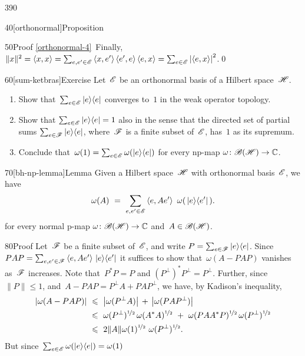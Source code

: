 \begin{parsec}{390}
\begin{point}{40}[orthonormal]{Proposition}
\begin{point}{50}{Proof}
\ref{orthonormal-4}\ 
Finally,
$\|x\|^2=\left<x,x\right>
= \sum_{e,e'\in\mathscr{E}}
\left<x,e'\right>\left<e',e\right>\left<e,x\right>
= \sum_{e\in \mathscr{E}} \left|\left<e,x\right>\right|^2$.\qed
\end{point}
\end{point}
\begin{point}{60}[sum-ketbras]{Exercise}%
Let~$\mathscr{E}$ be an orthonormal basis of a Hilbert space~$\mathscr{H}$.
\begin{enumerate}
\item
Show that~$\sum_{e\in\mathscr{E}} \left|e\right>\!\left<e\right|$
converges to~$1$
in the weak operator topology.
\item
Show that $\sum_{e\in\mathscr{E}}\left|e\right>\!\left<e\right|=1$
also in the sense
that the directed
set of partial sums
$\sum_{e\in \mathscr{F}} \left|e\right>\!\left<e\right|$,
where~$\mathscr{F}$ is a finite subset of~$\mathscr{E}$,
has~$1$ as its supremum.
\item
Conclude that~$\omega(1)=\sum_{e\in\mathscr{E}} \omega(\left|e\right>\!\left<e\right|)$
for every np-map $\omega\colon \mathscr{B}(\mathscr{H})\to\mathbb{C}$.
\end{enumerate}
\end{point}
\begin{point}{70}[bh-np-lemma]{Lemma}%
Given a Hilbert space~$\mathscr{H}$
with orthonormal basis~$\mathscr{E}$,
we have
\begin{equation*}
	\omega(A)\ = \ 
	\sum_{e,e'\in\scrE} \left<e,Ae'\right>\ \omega(\,\ketbra{e}{e'}\,).
\end{equation*}
for every normal p-map $\omega\colon \mathscr{B}(\mathscr{H})\to\mathbb{C}$
and~$A\in\mathscr{B}(\mathscr{H})$.
\begin{point}{80}{Proof}%
Let~$\mathscr{F}$ be a finite subset of~$\mathscr{E}$,
and write $P=\sum_{e\in \mathscr{F}} \left|e\right>\!\left<e\right|$.
Since $PAP
= \sum_{e,e'\in\mathscr{F}}\left<e,Ae'\right>\,\left|e\right>\!\left<e'\right|$
it suffices
to show that~$\omega(A-PAP)$
vanishes as~$\mathscr{F}$ increases.
Note that~$P^*P=P$ and
$(P^\perp)^*P^\perp=P^\perp$.
Further,
since
$\|P\|\leq 1$,
and~$A-PAP=P^\perp A + PAP^\perp$,
we have,
by Kadison's inequality,
\begin{alignat*}{3}
\left|\omega(A-PAP)\right|
\ &\leq\  \left|\omega(P^\perp A)\right| \,+\,\left|\omega(PAP^\perp)\right| \\
\ &\leq\  
\omega(P^\perp)^{\nicefrac{1}{2}}\,
\omega(A^*A)^{\nicefrac{1}{2}}
\ +\ 
\omega(PAA^*P)^{\nicefrac{1}{2}}\,
\omega(P^\perp)^{\nicefrac{1}{2}}\\
\ &\leq\  
2\|A\| 
\omega(1)^{\nicefrac{1}{2}}\ 
\omega(P^\perp)^{\nicefrac{1}{2}}.
\end{alignat*}
But since~$\sum_{e\in\mathscr{E}} \omega(\left|e\right>\!\left<e\right|)=\omega(1)$

\end{point}
\end{point}
\end{parsec}
